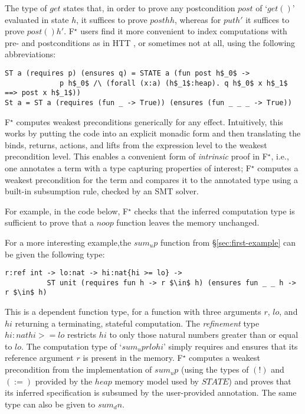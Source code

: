 \documentclass[sigplan,screen]{acmart}\settopmatter{}
\newcommand\fstar{F$^\star$\xspace}
\begin{document}
\noindent The type of \ls$get$ states that, in order to prove any
postcondition \ls$post$ of `\ls$get ()$' evaluated in state \ls$h$, it
suffices to prove \ls$post h h$, whereas for \ls$put h'$ it suffices
to prove \ls$post () h'$.
%
%
\fstar users find it more convenient to index computations with pre- and
postconditions as in HTT \cite{nmb08htt}, or sometimes
not at all, using the following abbreviations:

\begin{lstlisting}
ST a (requires p) (ensures q) = STATE a (fun post h$_0$ -> 
             p h$_0$ /\ (forall (x:a) (h$_1$:heap). q h$_0$ x h$_1$ ==> post x h$_1$))
St a = ST a (requires (fun _ -> True)) (ensures (fun _ _ _ -> True))
\end{lstlisting}

\fstar{} computes weakest preconditions
generically for any effect.
%
Intuitively, this works by putting the code into an explicit monadic
form and then translating the binds, returns, actions, and lifts from the
expression level to the weakest precondition level.
%
This enables a convenient form of \emph{intrinsic} proof in \fstar,
i.e., one annotates a term with a type capturing properties of
interest; \fstar computes a weakest precondition for the term and
compares it to the annotated type using a built-in subsumption rule,
checked by an SMT solver.

For example, \iffull in the code below, \fstar{} checks that the inferred
computation type is sufficient to prove that a \ls$noop$ function leaves the
memory unchanged.


For a more interesting example,\fi the \ls$sum_up$ function
from \S\ref{sec:first-example} can be given the following type:

\begin{lstlisting}
r:ref int -> lo:nat -> hi:nat{hi >= lo} -> 
          ST unit (requires fun h -> r $\in$ h) (ensures fun _ _ h -> r $\in$ h)
\end{lstlisting}

This is a dependent function type, for a function with three
arguments \ls$r$, \ls$lo$, and \ls$hi$ returning a terminating, stateful
computation.
%
The \emph{refinement} type \ls$hi:nat{hi >= lo}$ restricts
\ls$hi$ to only those natural numbers greater than or equal to \ls$lo$.
%
The computation type of `\ls$sum_up r lo hi$' simply requires and ensures
that its reference argument \ls$r$ is present in the memory.
%
\fstar computes a weakest precondition from the implementation of
\ls$sum_up$ (using the types of \ls$(!)$ and \ls$(:=)$ %
provided by
the
\ls$heap$ memory model used by \ls$STATE$) and proves that its
inferred specification is subsumed by the user-provided annotation.
The same type can also be given to \ls$sum_dn$.
\end{document}

